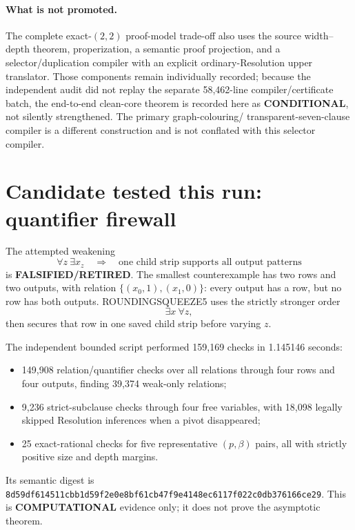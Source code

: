 \documentclass[11pt]{article}
\newcommand{\COMP}{\textbf{COMPUTATIONAL}}
\newcommand{\COND}{\textbf{CONDITIONAL}}
\newcommand{\RET}{\textbf{FALSIFIED/RETIRED}}
\begin{document}
\paragraph{What is not promoted.}
The complete exact-$(2,2)$ proof-model trade-off also uses the source width--depth
theorem, properization, a semantic proof projection, and a selector/duplication
compiler with an explicit ordinary-Resolution upper translator.  Those components
remain individually recorded; because the independent audit did not replay the
separate 58,462-line compiler/certificate batch, the end-to-end clean-core theorem is
recorded here as \COND{}, not silently strengthened.  The primary graph-colouring/
transparent-seven-clause compiler is a different construction and is not conflated
with this selector compiler.

\section{Candidate tested this run: quantifier firewall}
The attempted weakening
\[
 \forall z\ \exists x_z\quad\Longrightarrow\quad
 \text{one child strip supports all output patterns}                    \tag{4}
\]
is \RET{}.  The smallest counterexample has two rows and two outputs, with relation
\(\{(x_0,1),(x_1,0)\}\): every output has a row, but no row has both outputs.
ROUNDINGSQUEEZE5 uses the strictly stronger order
\[
 \exists x\ \forall z,                                                   \tag{5}
\]
then secures that row in one saved child strip before varying $z$.

The independent bounded script
 performed 159,169 checks in
1.145146 seconds:
\begin{itemize}
\item 149,908 relation/quantifier checks over all relations through four rows and
four outputs, finding 39,374 weak-only relations;
\item 9,236 strict-subclause checks through four free variables, with 18,098 legally
skipped Resolution inferences when a pivot disappeared;
\item 25 exact-rational checks for five representative $(p,\beta)$ pairs, all with
strictly positive size and depth margins.
\end{itemize}
Its semantic digest is
\texttt{8d59df614511cbb1d59f2e0e8bf61cb47f9e4148ec6117f022c0db376166ce29}.
This is \COMP{} evidence only; it does not prove the asymptotic theorem.
\end{document}
